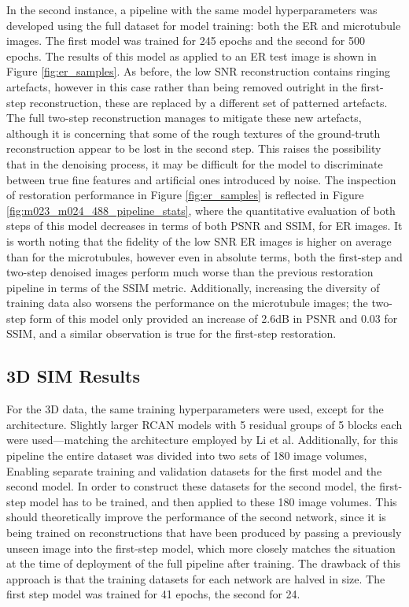 \documentclass[12pt]{article}
\begin{document}
In the second instance, a pipeline with the same model hyperparameters was developed using the full dataset for model training:
both the ER and microtubule images.
The first model was trained for 245 epochs and the second for 500 epochs.
The results of this model as applied to an ER test image is shown in Figure \ref{fig:er_samples}.
As before, the low SNR reconstruction contains ringing artefacts,
however in this case rather than being removed outright in the first-step reconstruction,
these are replaced by a different set of patterned artefacts.
The full two-step reconstruction manages to mitigate these new artefacts,
although it is concerning that some of the rough textures of the ground-truth reconstruction appear to be lost in the second step.
This raises the possibility that in the denoising process,
it may be difficult for the model to discriminate between true fine features and artificial ones introduced by noise.
The inspection of restoration performance in Figure \ref{fig:er_samples} is reflected in Figure \ref{fig:m023_m024_488_pipeline_stats},
where the quantitative evaluation of both steps of this model decreases in terms of both PSNR and SSIM, for ER images.
It is worth noting that the fidelity of the low SNR ER images is higher on average than for the microtubules,
however even in absolute terms, both the first-step and two-step denoised images perform much worse than the previous restoration pipeline in terms of the SSIM metric.
Additionally, increasing the diversity of training data also worsens the performance on the microtubule images;
the two-step form of this model only provided an increase of 2.6dB in PSNR and 0.03 for SSIM,
and a similar observation is true for the first-step restoration.

\subsection{3D SIM Results}

For the 3D data, the same training hyperparameters were used, except for the architecture.
Slightly larger RCAN models with 5 residual groups of 5 blocks each were used---matching the architecture employed by Li et al.
Additionally, for this pipeline the entire dataset was divided into two sets of 180 image volumes,
Enabling separate training and validation datasets for the first model and the second model.
In order to construct these datasets for the second model, the first-step model has to be trained,
and then applied to these 180 image volumes.
This should theoretically improve the performance of the second network,
since it is being trained on reconstructions that have been produced by passing a previously unseen image into the first-step model,
which more closely matches the situation at the time of deployment of the full pipeline after training.
The drawback of this approach is that the training datasets for each network are halved in size.
The first step model was trained for 41 epochs, the second for 24.
\end{document}
